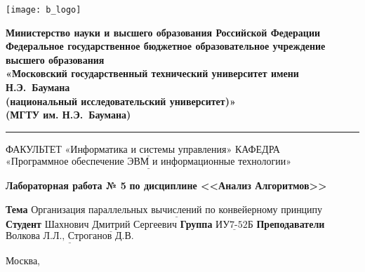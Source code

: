 \thispagestyle{empty}

\noindent \begin{minipage}{0.15\textwidth}
	\texttt{[image: b\_logo]}
\end{minipage}
\noindent\begin{minipage}{0.85\textwidth}\centering
	\textbf{Министерство науки и высшего образования Российской Федерации}\\
	\textbf{Федеральное государственное бюджетное образовательное учреждение высшего образования}\\
	\textbf{«Московский государственный технический университет имени Н.Э.~Баумана}\\
	\textbf{(национальный исследовательский университет)»}\\
	\textbf{(МГТУ им. Н.Э.~Баумана)}
\end{minipage}

\noindent\rule{\linewidth}{3pt}
\newline\newline
\noindent ФАКУЛЬТЕТ $\underline{\text{«Информатика и системы управления»}}$ \newline\newline
\noindent КАФЕДРА $\underline{\text{«Программное обеспечение ЭВМ и информационные технологии»}}$

\vspace{1cm}

\begin{minipage}{\textwidth}
		\centering
		\Large\textbf{Лабораторная работа № 5}\newline
		\textbf{по дисциплине <<Анализ Алгоритмов>>}\newline\newline
\end{minipage}

\noindent\textbf{Тема} $\underline{\text{Организация параллельных вычислений по конвейерному принципу}}$\newline\newline
\noindent\textbf{Студент} $\underline{\text{Шахнович Дмитрий Сергеевич}}$\newline\newline
\noindent\textbf{Группа} $\underline{\text{ИУ7-52Б}}$\newline\newline
\noindent\textbf{Преподаватели} $\underline{\text{Волкова Л.Л., Строганов Д.В.}}$\newline

\begin{center}
	\vfill
	Москва,~\the\year
\end{center}
\clearpage
